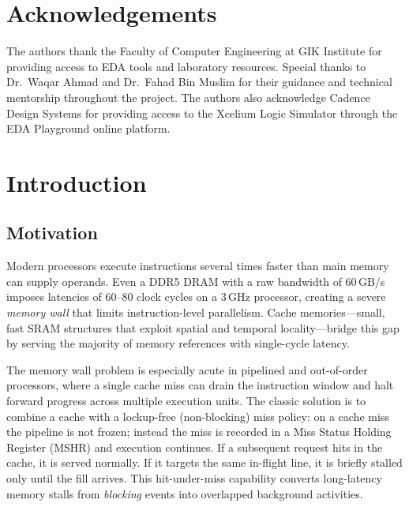 \documentclass[12pt,letterpaper]{report}
\begin{document}
\clearpage

\chapter*{Acknowledgements}

The authors thank the Faculty of Computer Engineering at GIK Institute
for providing access to EDA tools and laboratory resources.  Special
thanks to Dr.\ Waqar Ahmad and Dr.\ Fahad Bin Muslim for their guidance
and technical mentorship throughout the project.  The authors also
acknowledge Cadence Design Systems for providing access to the Xcelium
Logic Simulator through the EDA Playground online platform.

\clearpage

\tableofcontents
\clearpage
\listoffigures
\clearpage
\listoftables
\clearpage


\chapter{Introduction}

\section{Motivation}

Modern processors execute instructions several times faster than main
memory can supply operands.  Even a DDR5 DRAM with a raw bandwidth of
60\,GB/s imposes latencies of 60--80 clock cycles on a 3\,GHz
processor, creating a severe \emph{memory wall} that limits
instruction-level parallelism.  Cache memories---small, fast SRAM
structures that exploit spatial and temporal locality---bridge this gap
by serving the majority of memory references with single-cycle latency.

The memory wall problem is especially acute in pipelined and
out-of-order processors, where a single cache miss can drain the
instruction window and halt forward progress across multiple execution
units.  The classic solution is to combine a cache with a lockup-free
(non-blocking) miss policy: on a cache miss the pipeline is not
frozen; instead the miss is recorded in a Miss Status Holding Register
(MSHR) and execution continues.  If a subsequent request hits in the
cache, it is served normally.  If it targets the same in-flight line,
it is briefly stalled only until the fill arrives.  This
hit-under-miss capability converts long-latency memory stalls from
\emph{blocking} events into overlapped background activities.
\end{document}
